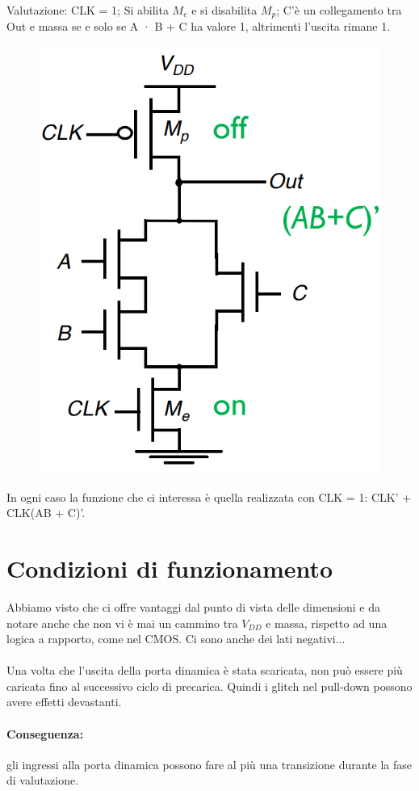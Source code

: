 \paragraph{}
Valutazione: CLK	=	1; Si	abilita $M_e$ e	si disabilita $M_p$; C'è un	collegamento tra Out e	massa se	
e	solo	se	A ·	B	+	C	ha	valore 1, altrimenti l'uscita rimane 1.

\begin{figure}[htbp]
    \centering
    \includegraphics[width=0.27\linewidth]{img/esempio_valutazione.png}
    
    
\end{figure}

In ogni caso la funzione che ci interessa è quella realizzata con CLK = 1: CLK' +	CLK(AB	+	C)'.

\newpage
\section{Condizioni di funzionamento}

Abbiamo visto che ci offre vantaggi dal punto di vista delle dimensioni e da notare anche che non vi è mai un cammino tra $V_{DD}$ e massa, rispetto ad una logica a rapporto, come nel CMOS. Ci sono anche dei lati negativi...

\paragraph{}
Una volta che l'uscita della porta dinamica è	stata scaricata,	non	può essere più caricata fino al	successivo ciclo di	precarica. Quindi i glitch nel pull-down possono avere effetti devastanti.
\paragraph{Conseguenza:} gli ingressi alla porta dinamica possono fare	al	più una transizione durante la	fase di	valutazione.

\paragraph{}


